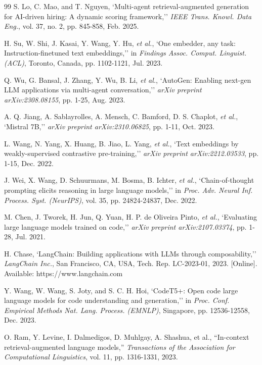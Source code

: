 \documentclass[12pt,a4paper]{report}
\begin{document}
\begin{thebibliography}{99}
S. Lo, C. Mao, and T. Nguyen, `Multi-agent retrieval-augmented generation for AI-driven hiring: A dynamic scoring framework,'' \textit{IEEE Trans. Knowl. Data Eng.}, vol. 37, no. 2, pp. 845-858, Feb. 2025.

H. Su, W. Shi, J. Kasai, Y. Wang, Y. Hu, \textit{et al.}, `One embedder, any task: Instruction-finetuned text embeddings,'' in \textit{Findings Assoc. Comput. Linguist. (ACL)}, Toronto, Canada, pp. 1102-1121, Jul. 2023.

Q. Wu, G. Bansal, J. Zhang, Y. Wu, B. Li, \textit{et al.}, `AutoGen: Enabling next-gen LLM applications via multi-agent conversation,'' \textit{arXiv preprint arXiv:2308.08155}, pp. 1-25, Aug. 2023.

A. Q. Jiang, A. Sablayrolles, A. Mensch, C. Bamford, D. S. Chaplot, \textit{et al.}, `Mistral 7B,'' \textit{arXiv preprint arXiv:2310.06825}, pp. 1-11, Oct. 2023.

L. Wang, N. Yang, X. Huang, B. Jiao, L. Yang, \textit{et al.}, `Text embeddings by weakly-supervised contrastive pre-training,'' \textit{arXiv preprint arXiv:2212.03533}, pp. 1-15, Dec. 2022.

J. Wei, X. Wang, D. Schuurmans, M. Bosma, B. Ichter, \textit{et al.}, `Chain-of-thought prompting elicits reasoning in large language models,'' in \textit{Proc. Adv. Neural Inf. Process. Syst. (NeurIPS)}, vol. 35, pp. 24824-24837, Dec. 2022.

M. Chen, J. Tworek, H. Jun, Q. Yuan, H. P. de Oliveira Pinto, \textit{et al.}, `Evaluating large language models trained on code,'' \textit{arXiv preprint arXiv:2107.03374}, pp. 1-28, Jul. 2021.

H. Chase, `LangChain: Building applications with LLMs through composability,'' \textit{LangChain Inc.}, San Francisco, CA, USA, Tech. Rep. LC-2023-01, 2023. [Online]. Available: https://www.langchain.com

Y. Wang, W. Wang, S. Joty, and S. C. H. Hoi, `CodeT5+: Open code large language models for code understanding and generation,'' in \textit{Proc. Conf. Empirical Methods Nat. Lang. Process. (EMNLP)}, Singapore, pp. 12536-12558, Dec. 2023.

O. Ram, Y. Levine, I. Dalmedigos, D. Muhlgay, A. Shashua, et al., ``In-context retrieval-augmented language models,'' \textit{Transactions of the Association for Computational Linguistics}, vol. 11, pp. 1316-1331, 2023.


\end{thebibliography}
\end{document}
